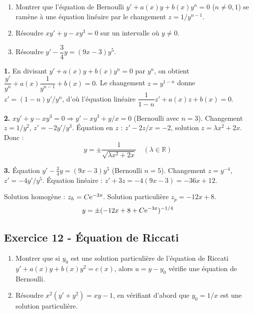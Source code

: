 \documentclass[12pt,a4paper]{article}
\begin{document}
\begin{boiteexercice}
\begin{enumerate}
  \item Montrer que l'équation de Bernoulli $y' + a(x)y + b(x)y^n = 0$ ($n \neq 0, 1$) se ramène à une équation linéaire par le changement $z = 1/y^{n-1}$.
  \item Résoudre $xy' + y - xy^3 = 0$ sur un intervalle où $y \neq 0$.
  \item Résoudre $y' - \dfrac{3}{4}y = (9x-3)y^5$.
\end{enumerate}
\end{boiteexercice}

\begin{boitecorrige}
\textbf{1.} En divisant $y' + a(x)y + b(x)y^n = 0$ par $y^n$, on obtient $\dfrac{y'}{y^n} + a(x)\dfrac{1}{y^{n-1}} + b(x) = 0$. Le changement $z = y^{1-n}$ donne $z' = (1-n)y'/y^n$, d'où l'équation linéaire $\dfrac{1}{1-n}z' + a(x)z + b(x) = 0$.

\textbf{2.} $xy' + y - xy^3 = 0 \Rightarrow y' - xy^3 + y/x = 0$ (Bernoulli avec $n=3$). Changement $z = 1/y^2$, $z' = -2y'/y^3$. Équation en $z$ : $z' - 2z/x = -2$, solution $z = \lambda x^2 + 2x$. Donc :
\[
y = \pm \frac{1}{\sqrt{\lambda x^2 + 2x}} \quad (\lambda \in \mathbb{R})
\]

\textbf{3.} Équation $y' - \frac{3}{4}y = (9x-3)y^5$ (Bernoulli $n=5$). Changement $z = y^{-4}$, $z' = -4y'/y^5$. Équation linéaire : $z' + 3z = -4(9x-3) = -36x+12$.

Solution homogène : $z_h = C\mathrm{e}^{-3x}$. Solution particulière $z_p = -12x + 8$.
\[
y = \pm(-12x + 8 + C\mathrm{e}^{-3x})^{-1/4}
\]
\end{boitecorrige}

\subsection*{Exercice 12 - Équation de Riccati \niveau{\difficile}}

\begin{boiteexercice}
\begin{enumerate}
  \item Montrer que si $y_0$ est une solution particulière de l'équation de Riccati $y' + a(x)y + b(x)y^2 = c(x)$, alors $u = y - y_0$ vérifie une équation de Bernoulli.
  \item Résoudre $x^2(y' + y^2) = xy - 1$, en vérifiant d'abord que $y_0 = 1/x$ est une solution particulière.
\end{enumerate}
\end{boiteexercice}
\end{document}
